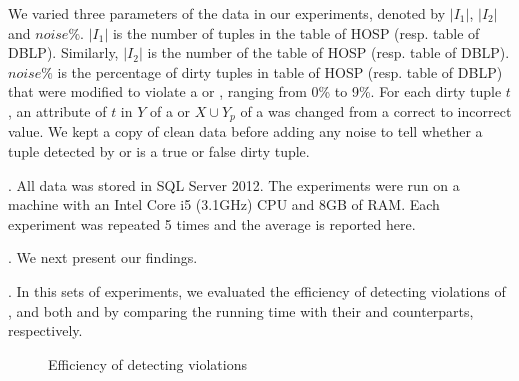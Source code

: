 \begin{footnotesize}
\end{footnotesize}

We varied three parameters of the data in our experiments, denoted by $|I_1|$, $|I_2|$ and $noise\%$. $|I_1|$ is the number of tuples in the table  of HOSP (resp. table  of DBLP). Similarly, $|I_2|$ is the number of the table  of HOSP (resp. table  of DBLP). $noise\%$ is the percentage of dirty tuples in table  of HOSP (resp. table  of DBLP) that were modified to violate a \pCFD or \pCIND, ranging from 0\% to 9\%. For each dirty tuple $t$, an attribute of $t$ in $Y$ of a \pCFD or $X \cup Y_p$ of a \pCIND was changed from a correct to incorrect value. We kept a copy of clean data before adding any noise to tell whether a tuple detected by \pCFDs or \pCINDs is a true or false dirty tuple.

. All data was stored in SQL Server 2012. The experiments were run on a machine with an Intel Core i5 (3.1GHz) CPU and 8GB of RAM. Each experiment was repeated 5 times and the average is reported here.

. We next present our findings.

. In this sets of experiments, we evaluated the efficiency of detecting violations of \pCFDs, \pCINDs and both \pCFDs and \pCINDs by comparing the running time with their \CFDs and \CINDs counterparts, respectively.

\begin{figure*}
  \centering
  \quad
  \quad
  \quad
  \caption{Efficiency of detecting \pCFD violations}\label{fig_exp1_cfdp}
\end{figure*}

